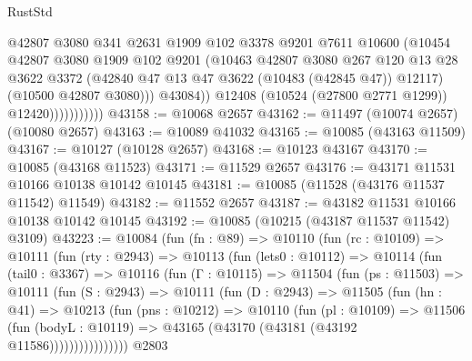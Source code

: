 \begin{lexlean}{RustStd}
\begin{coremodule}
                              @42807
                              @3080
                              @341
                              @2631
                              @1909
                              @102
                              @3378
                              @9201
                              @7611
                              @10600
                              (@10454
                                @42807
                                @3080
                                @1909
                                @102
                                @9201
                                (@10463
                                  @42807
                                  @3080
                                  @267
                                  @120
                                  @13
                                  @28
                                  @3622
                                  @3372
                                  (@42840 @47 @13 @47 @3622 (@10483 (@42845 @47)) @12117)
                                  (@10500 @42807 @3080)))
                              @43084))
                          @12408
                          (@10524 (@27800 @2771 @1299))
                          @12420)))))))))))
@43158 := @10068 @2657
@43162 := @11497 (@10074 @2657) (@10080 @2657)
@43163 := @10089 @41032
@43165 := @10085 (@43163 @11509)
@43167 := @10127 (@10128 @2657)
@43168 := @10123 @43167
@43170 := @10085 (@43168 @11523)
@43171 := @11529 @2657
@43176 := @43171 @11531 @10166 @10138 @10142 @10145
@43181 := @10085 (@11528 (@43176 @11537 @11542) @11549)
@43182 := @11552 @2657
@43187 := @43182 @11531 @10166 @10138 @10142 @10145
@43192 := @10085 (@10215 (@43187 @11537 @11542) @3109)
@43223 := @10084
    (fun (fn : @89) =>
    @10110
      (fun (rc : @10109) =>
      @10111
        (fun (rty : @2943) =>
        @10113
          (fun (lets0 : @10112) =>
          @10114
            (fun (tail0 : @3367) =>
            @10116
              (fun (Γ : @10115) =>
              @11504
                (fun (ps : @11503) =>
                @10111
                  (fun (S : @2943) =>
                  @10111
                    (fun (D : @2943) =>
                    @11505
                      (fun (hn : @41) =>
                      @10213
                        (fun (pns : @10212) =>
                        @10110
                          (fun (pl : @10109) =>
                          @11506
                            (fun (bodyL : @10119) =>
                            @43165 (@43170 (@43181 (@43192 @11586))))))))))))))))
    @2803

\end{coremodule}
\end{lexlean}
